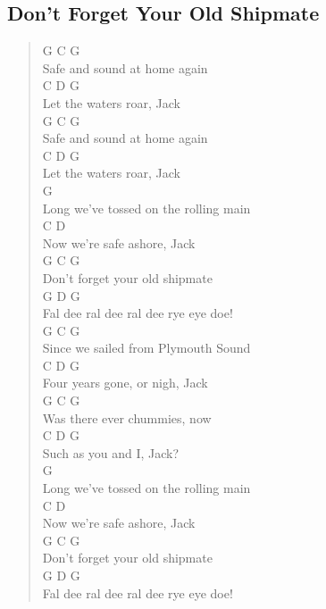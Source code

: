\documentclass[11pt]{article}
\begin{document}
\subsection{Don't Forget Your Old Shipmate}
\label{sec:org179b661}
\begin{verse}
G                  C      G\\
Safe and sound at home again\\
C        D      G\\
Let the waters roar, Jack\\
G                  C     G\\
Safe and sound at home again\\
C        D      G\\
Let the waters roar, Jack\\
G\\
Long we've tossed on the rolling main\\
C                D\\
Now we're safe ashore, Jack\\
G                  C       G\\
Don't forget your old shipmate\\
G                       D       G\\
Fal dee ral dee ral dee rye eye doe!\\
\vspace*{1em}
\vspace*{1em}
G                      C       G\\
Since we sailed from Plymouth Sound\\
C           D        G\\
Four years gone, or nigh, Jack\\
G                C       G\\
Was there ever chummies, now\\
C        D      G\\
Such as you and I, Jack?\\
G\\
Long we've tossed on the rolling main\\
C                 D\\
Now we're safe ashore, Jack\\
G                  C      G\\
Don't forget your old shipmate\\
G                        D       G\\
Fal dee ral dee ral dee rye eye doe!\\
\vspace*{1em}

\end{verse}
\end{document}
